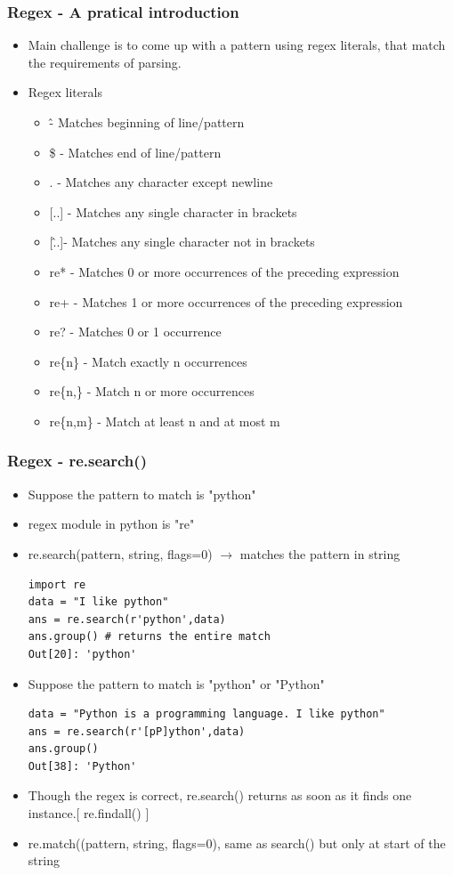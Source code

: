 \documentclass[xcolor=table,10pt]{beamer}
\begin{document}
\begin{frame}
\frametitle{Regex - A pratical introduction}
\begin{itemize}
\item Main challenge is to come up with a pattern using regex literals, that match the requirements of parsing.
\item Regex literals
	\begin{itemize}
		\item \^ - Matches beginning of line/pattern
		\item \$ - Matches end of line/pattern
		\item . - Matches any character except newline
		\item {[}..{]} - Matches any single character in brackets
		\item {[}\^..{]}- Matches any single character not in brackets
		\item re* - Matches 0 or more occurrences of the preceding expression
		\item re+ - Matches 1 or more occurrences of the preceding expression
		\item re? - Matches 0 or 1 occurrence
		\item re\{n\} - Match exactly n occurrences
		\item re\{n,\} - Match n or more occurrences
		\item re\{n,m\} - Match at least n and at most m
   	\end{itemize}
\end{itemize}
\end{frame}

\begin{frame}[fragile]
\frametitle{Regex - re.search()}
\begin{itemize}
\item Suppose the pattern to match is "python"
\item regex module in python is "re"
\item re.search(pattern, string, flags=0) $\rightarrow$ matches the pattern in string\\

\begin{verbatim}
import re
data = "I like python"
ans = re.search(r'python',data)
ans.group() # returns the entire match
Out[20]: 'python'
\end{verbatim}
\small
\item Suppose the pattern to match is "python" or "Python"\\

\begin{verbatim}
data = "Python is a programming language. I like python"
ans = re.search(r'[pP]ython',data)
ans.group()
Out[38]: 'Python'
\end{verbatim}
\small
\item Though the regex is correct, re.search() returns as soon as it finds one instance.{[} re.findall() {]}
\item re.match((pattern, string, flags=0), same as search() but only at start of the string 
\end{itemize}
\end{frame}
\end{document}
